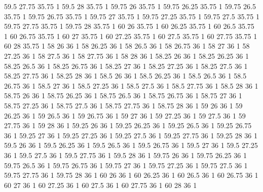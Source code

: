 59.5 27.75 35.75 1
59.5 28 35.75 1
59.75 26 35.75 1
59.75 26.25 35.75 1
59.75 26.5 35.75 1
59.75 26.75 35.75 1
59.75 27 35.75 1
59.75 27.25 35.75 1
59.75 27.5 35.75 1
59.75 27.75 35.75 1
59.75 28 35.75 1
60 26 35.75 1
60 26.25 35.75 1
60 26.5 35.75 1
60 26.75 35.75 1
60 27 35.75 1
60 27.25 35.75 1
60 27.5 35.75 1
60 27.75 35.75 1
60 28 35.75 1
58 26 36 1
58 26.25 36 1
58 26.5 36 1
58 26.75 36 1
58 27 36 1
58 27.25 36 1
58 27.5 36 1
58 27.75 36 1
58 28 36 1
58.25 26 36 1
58.25 26.25 36 1
58.25 26.5 36 1
58.25 26.75 36 1
58.25 27 36 1
58.25 27.25 36 1
58.25 27.5 36 1
58.25 27.75 36 1
58.25 28 36 1
58.5 26 36 1
58.5 26.25 36 1
58.5 26.5 36 1
58.5 26.75 36 1
58.5 27 36 1
58.5 27.25 36 1
58.5 27.5 36 1
58.5 27.75 36 1
58.5 28 36 1
58.75 26 36 1
58.75 26.25 36 1
58.75 26.5 36 1
58.75 26.75 36 1
58.75 27 36 1
58.75 27.25 36 1
58.75 27.5 36 1
58.75 27.75 36 1
58.75 28 36 1
59 26 36 1
59 26.25 36 1
59 26.5 36 1
59 26.75 36 1
59 27 36 1
59 27.25 36 1
59 27.5 36 1
59 27.75 36 1
59 28 36 1
59.25 26 36 1
59.25 26.25 36 1
59.25 26.5 36 1
59.25 26.75 36 1
59.25 27 36 1
59.25 27.25 36 1
59.25 27.5 36 1
59.25 27.75 36 1
59.25 28 36 1
59.5 26 36 1
59.5 26.25 36 1
59.5 26.5 36 1
59.5 26.75 36 1
59.5 27 36 1
59.5 27.25 36 1
59.5 27.5 36 1
59.5 27.75 36 1
59.5 28 36 1
59.75 26 36 1
59.75 26.25 36 1
59.75 26.5 36 1
59.75 26.75 36 1
59.75 27 36 1
59.75 27.25 36 1
59.75 27.5 36 1
59.75 27.75 36 1
59.75 28 36 1
60 26 36 1
60 26.25 36 1
60 26.5 36 1
60 26.75 36 1
60 27 36 1
60 27.25 36 1
60 27.5 36 1
60 27.75 36 1
60 28 36 1
